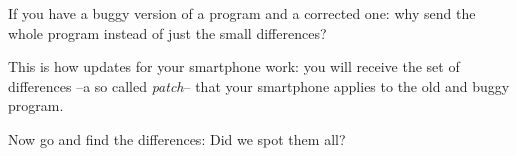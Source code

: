 
If you have a buggy version of a program and a corrected one: why
send the whole program instead of just the small differences?

This is how updates for your smartphone work: you will receive the
set of differences --a so called \emph{patch}-- that your smartphone applies
to the old and buggy program.

Now go and find the differences: Did we spot them all?

